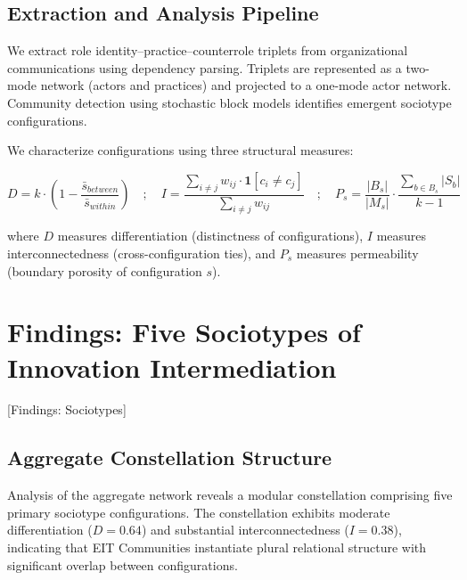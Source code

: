 \documentclass[../main.tex]{subfiles}
\begin{document}
\subsection{Extraction and Analysis Pipeline}

We extract role identity--practice--counterrole triplets from organizational communications using dependency parsing. Triplets are represented as a two-mode network (actors and practices) and projected to a one-mode actor network. Community detection using stochastic block models identifies emergent sociotype configurations.

We characterize configurations using three structural measures:

\begin{equation}
    D = k \cdot \left(1 - \frac{\bar{s}_{between}}{\bar{s}_{within}}\right) \quad ; \quad
    I = \frac{\sum_{i \neq j} w_{ij} \cdot \mathbf{1}[c_i \neq c_j]}{\sum_{i \neq j} w_{ij}} \quad ; \quad
    P_s = \frac{|B_s|}{|M_s|} \cdot \frac{\sum_{b \in B_s} |S_b|}{k - 1}
\end{equation}

where $D$ measures differentiation (distinctness of configurations), $I$ measures interconnectedness (cross-configuration ties), and $P_s$ measures permeability (boundary porosity of configuration $s$).


\section{Findings: Five Sociotypes of Innovation Intermediation}[Findings: Sociotypes]

\subsection{Aggregate Constellation Structure}

Analysis of the aggregate network reveals a modular constellation comprising five primary sociotype configurations. The constellation exhibits moderate differentiation ($D = 0.64$) and substantial interconnectedness ($I = 0.38$), indicating that EIT Communities instantiate plural relational structure with significant overlap between configurations.
\end{document}
